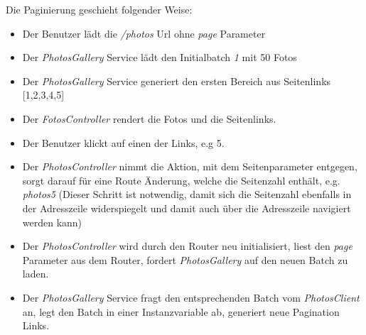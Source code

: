 Die Paginierung geschieht folgender Weise:

\begin{itemize}
  \item Der Benutzer lädt die \textit{/photos} Url ohne \textit{page} Parameter
  \item Der \textit{PhotosGallery} Service lädt den Initialbatch \textit{1} mit 50 Fotos 
  \item Der \textit{PhotosGallery} Service generiert den ersten Bereich aus Seitenlinks [1,2,3,4,5]
  \item Der \textit{FotosController} rendert die Fotos und die Seitenlinks.
  \item Der Benutzer klickt auf einen der Links, e.g 5.
  \item Der \textit{PhotosController} nimmt die Aktion, mit dem Seitenparameter entgegen, sorgt darauf für eine Route Änderung, welche die Seitenzahl enthält, e.g. \textit{\/photos\/5}
  (Dieser Schritt ist notwendig, damit sich die Seitenzahl ebenfalls in der Adresszeile widerspiegelt und damit auch über die Adresszeile navigiert werden kann)
  \item Der \textit{PhotosController} wird durch den Router neu initialisiert, liest den \textit{page} Parameter aus dem Router, fordert \textit{PhotosGallery} auf den neuen Batch zu laden.
  \item Der \textit{PhotosGallery} Service fragt den entsprechenden Batch vom \textit{PhotosClient} an, legt den Batch in einer Instanzvariable ab, generiert neue Pagination Links.
\end{itemize}

